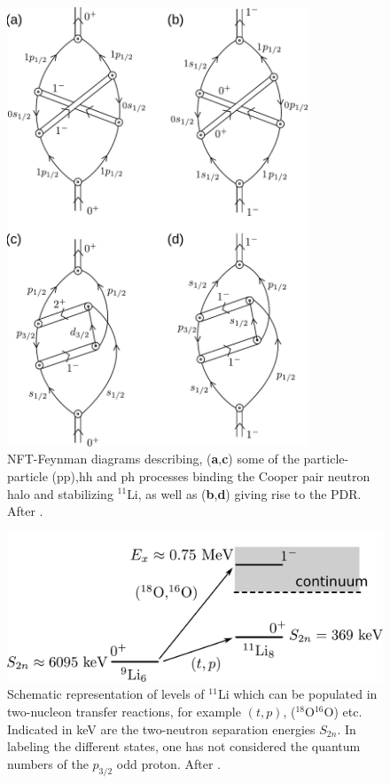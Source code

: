 \begin{subappendices}
\begin{figure}
\includegraphics[width=0.8\textwidth]{C8/figsC8/Nobel40Years-4b.pdf}
\caption{NFT-Feynman diagrams describing, (\textbf{a},\textbf{c}) some of the particle-particle (pp),hh and ph processes binding the Cooper pair neutron halo 
and stabilizing $^{11}$Li, as well as  (\textbf{b},\textbf{d}) giving rise to the PDR. After \cite{Broglia:16}.}\label{fig6.I.2}
\end{figure}

\begin{figure}
\includegraphics[width=\textwidth]{C8/figsC8/figa3_newnew.pdf}
\caption{Schematic representation of levels of $^{11}$Li which can be populated  in two-nucleon transfer reactions, for example $(t,p)$, ($^{18}$O$^{16}$O) etc. Indicated in keV are the two-neutron
separation energies $S_{2n}$. In labeling the different states, one has not considered the quantum numbers of the $p_{3/2}$ odd proton. After \cite{Broglia:16}.}\label{fig6.I.3} 
\end{figure}


\end{subappendices}
